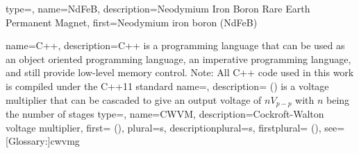 {
    type=\acronymtype,
    name={NdFeB},
    description={Neodymium Iron Boron Rare Earth Permanent Magnet},
    first={Neodymium iron boron (NdFeB)}
}

{%
    name={C++},
    description={C++ is a programming language that can be used as an object oriented programming language, an imperative programming language, and still provide low-level memory control. Note: All C++ code used in this work is compiled under the C++11 standard}
}
{
    name={},
    description={ () is a voltage multiplier that can be cascaded to give an output voltage of \(nV_{p-p}\) with \(n\) being the number of stages}
}
{
    type=\acronymtype,
    name={CWVM},
    description={Cockroft-Walton voltage multiplier},
    first={ ()},
    plural={s},
    descriptionplural={s},
    firstplural={ ()},
    see=[Glossary:]{cwvmg}
}
